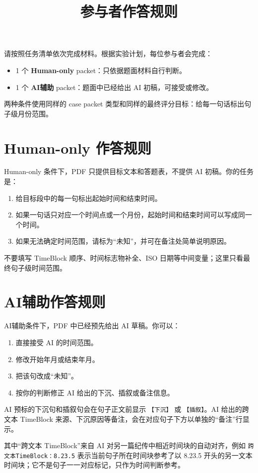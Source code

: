 \documentclass[fontset=none,12pt,a4paper]{ctexart}
\title{\textbf{参与者作答规则}}
\author{}
\date{}
\newcommand{\markexample}[1]{\texttt{#1}}
\begin{document}
\maketitle
\vspace{-2em}

\begin{tcolorbox}[colback=RuleBlue,colframe=RuleLine,title=实验安排]
请按照任务清单依次完成材料。根据实验计划，每位参与者会完成：
\begin{itemize}
  \item 1 个 \textbf{Human-only} packet：只依据题面材料自行判断。
  \item 1 个 \textbf{AI辅助} packet：题面中已经给出 AI 初稿，可接受或修改。
\end{itemize}
两种条件使用同样的 case packet 类型和同样的最终评分目标：给每一句话标出句子级月份范围。
\end{tcolorbox}

\section*{Human-only 作答规则}
\begin{tcolorbox}[colback=white,colframe=black!25,title=Human-only]
Human-only 条件下，PDF 只提供目标文本和答题表，不提供 AI 初稿。你的任务是：
\begin{enumerate}
  \item 给目标段中的每一句标出起始时间和结束时间。
  \item 如果一句话只对应一个时间点或一个月份，起始时间和结束时间可以写成同一个时间。
  \item 如果无法确定时间范围，请标为“未知”，并可在备注处简单说明原因。
\end{enumerate}
不要填写 TimeBlock 顺序、时间标志物补全、ISO 日期等中间变量；这里只看最终句子级时间范围。
\end{tcolorbox}

\section*{AI辅助作答规则}
\begin{tcolorbox}[colback=gray!6,colframe=black!20,title=AI辅助]
AI辅助条件下，PDF 中已经预先给出 AI 草稿。你可以：
\begin{enumerate}
  \item 直接接受 AI 的时间范围。
  \item 修改开始年月或结束年月。
  \item 把该句改成“未知”。
  \item 按你的判断修正 AI 给出的下沉、插叙或备注信息。
\end{enumerate}

AI 预标的下沉句和插叙句会在句子正文前显示
\markexample{【下沉】} 或 \markexample{【插叙】}。AI 给出的跨文本 TimeBlock 来源、下沉原因等备注，会在对应句子下方以单独的“备注”行显示。

其中“跨文本 TimeBlock”来自 AI 对另一篇纪传中相近时间块的自动对齐，例如
\markexample{跨文本TimeBlock：8.23.5} 表示当前句子所在时间块参考了以 8.23.5 开头的另一文本时间块；它不是句子一一对应标记，只作为时间判断参考。
\end{tcolorbox}
\end{document}
